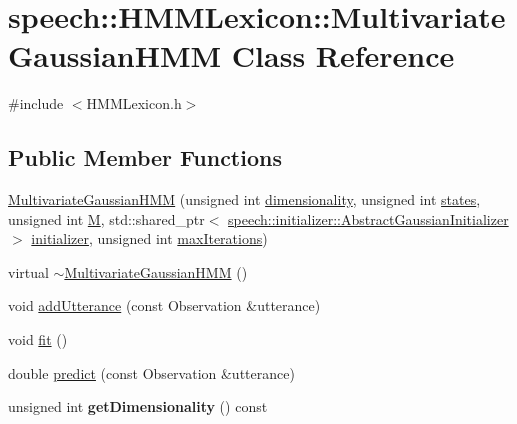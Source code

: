 \hypertarget{classspeech_1_1HMMLexicon_1_1MultivariateGaussianHMM}{\section{speech\+:\+:H\+M\+M\+Lexicon\+:\+:Multivariate\+Gaussian\+H\+M\+M Class Reference}
\label{classspeech_1_1HMMLexicon_1_1MultivariateGaussianHMM}
}


{\ttfamily \#include $<$H\+M\+M\+Lexicon.\+h$>$}

\subsection*{Public Member Functions}
\begin{DoxyCompactItemize}
\item 
\hyperlink{classspeech_1_1HMMLexicon_1_1MultivariateGaussianHMM_a6ca2f6c60881319eace485c5143c19fb}{Multivariate\+Gaussian\+H\+M\+M} (unsigned int \hyperlink{classspeech_1_1HMMLexicon_1_1MultivariateGaussianHMM_aa88d45cf1e299711ed0764166bb70bf1}{dimensionality}, unsigned int \hyperlink{classspeech_1_1HMMLexicon_1_1MultivariateGaussianHMM_a229cdec64f3eb25b3dc21aa32995ecd8}{states}, unsigned int \hyperlink{classspeech_1_1HMMLexicon_1_1MultivariateGaussianHMM_a6895e59700c70169286b362532cf3a37}{M}, std\+::shared\+\_\+ptr$<$ \hyperlink{classspeech_1_1initializer_1_1AbstractGaussianInitializer}{speech\+::initializer\+::\+Abstract\+Gaussian\+Initializer} $>$ \hyperlink{classspeech_1_1HMMLexicon_1_1MultivariateGaussianHMM_ac83431423d755d272ebb0c4a82c03940}{initializer}, unsigned int \hyperlink{classspeech_1_1HMMLexicon_1_1MultivariateGaussianHMM_adeadeddbbd4e05647b52357572d9cc94}{max\+Iterations})
\item 
virtual \hyperlink{classspeech_1_1HMMLexicon_1_1MultivariateGaussianHMM_af266fe9f23af1d1d9070bb612bad8743}{$\sim$\+Multivariate\+Gaussian\+H\+M\+M} ()
\item 
void \hyperlink{classspeech_1_1HMMLexicon_1_1MultivariateGaussianHMM_aa2947c26ab150841cbc12b2baa0f41b5}{add\+Utterance} (const Observation \&utterance)
\item 
void \hyperlink{classspeech_1_1HMMLexicon_1_1MultivariateGaussianHMM_a7700484ac8675c53d148a3919f736005}{fit} ()
\item 
double \hyperlink{classspeech_1_1HMMLexicon_1_1MultivariateGaussianHMM_a65a8308757f5e7c69f7e24b68f842975}{predict} (const Observation \&utterance)
\item 
\hypertarget{classspeech_1_1HMMLexicon_1_1MultivariateGaussianHMM_a4eb615a1cbd99e33272de124951b4d53}{unsigned int {\bfseries get\+Dimensionality} () const }\label{classspeech_1_1HMMLexicon_1_1MultivariateGaussianHMM_a4eb615a1cbd99e33272de124951b4d53}


\end{DoxyCompactItemize}
